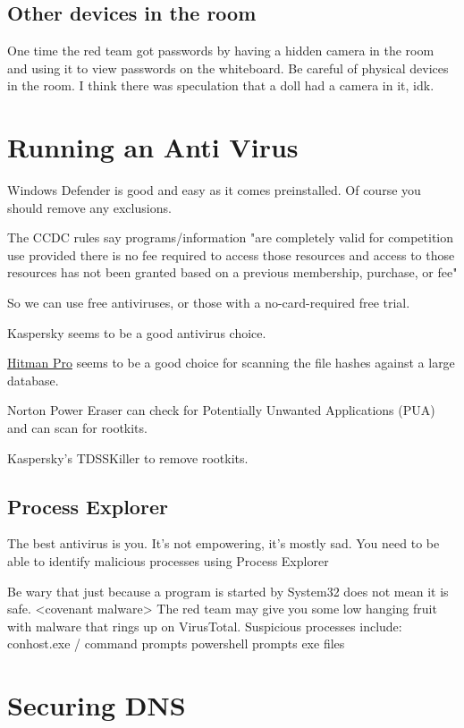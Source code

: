 \documentclass{article}
\begin{document}
\subsection{Other devices in the room}
One time the red team got passwords by having a hidden camera in the room and using it to view passwords on the whiteboard. 
Be careful of physical devices in the room. I think there was speculation that a doll had a camera in it, idk.

\section{Running an Anti Virus}
Windows Defender is good and easy as it comes preinstalled. Of course you should remove any exclusions.

The CCDC rules say programs/information "are completely valid for competition use provided there is no 
fee required to access those resources and access to 
those resources has not been granted based on a previous membership, purchase, or fee"

So we can use free antiviruses, or those with a no-card-required free trial.

Kaspersky seems to be a good antivirus choice.

\href{https://www.sophos.com/en-us/free-tools/hitmanpro}{Hitman Pro} seems to be a good choice for scanning the file hashes against a large database.

Norton Power Eraser can check for Potentially Unwanted Applications (PUA) and can scan for rootkits.

Kaspersky's TDSSKiller to remove rootkits.

\subsection{Process Explorer}
The best antivirus is you. It's not empowering, it's mostly sad.
You need to be able to identify malicious processes using Process Explorer

Be wary that just because a program is started by System32 does not mean it is safe. <covenant malware>
The red team may give you some low hanging fruit with malware that rings up on VirusTotal.
Suspicious processes include:
conhost.exe / command prompts
powershell prompts
exe files

\section{Securing DNS}
\end{document}
